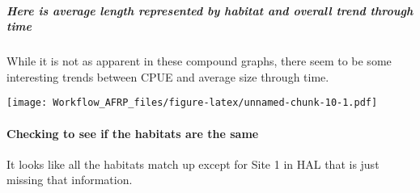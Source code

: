 \documentclass[
]{article}
\newenvironment{Shaded}{\begin{snugshade}}{\end{snugshade}}
\newcommand{\DataTypeTok}[1]{\textcolor[rgb]{0.13,0.29,0.53}{#1}}
\newcommand{\DecValTok}[1]{\textcolor[rgb]{0.00,0.00,0.81}{#1}}
\newcommand{\FloatTok}[1]{\textcolor[rgb]{0.00,0.00,0.81}{#1}}
\newcommand{\KeywordTok}[1]{\textcolor[rgb]{0.13,0.29,0.53}{\textbf{#1}}}
\newcommand{\NormalTok}[1]{#1}
\newcommand{\OperatorTok}[1]{\textcolor[rgb]{0.81,0.36,0.00}{\textbf{#1}}}
\newcommand{\StringTok}[1]{\textcolor[rgb]{0.31,0.60,0.02}{#1}}
\begin{document}
\hypertarget{here-is-average-length-represented-by-habitat-and-overall-trend-through-time}{%
\subparagraph{Here is average length represented by habitat and overall
trend through
time}\label{here-is-average-length-represented-by-habitat-and-overall-trend-through-time}}

While it is not as apparent in these compound graphs, there seem to be
some interesting trends between CPUE and average size through time.

\begin{Shaded}
\end{Shaded}

\texttt{[image: Workflow\_AFRP\_files/figure-latex/unnamed-chunk-10-1.pdf]}

\hypertarget{checking-to-see-if-the-habitats-are-the-same}{%
\paragraph{Checking to see if the habitats are the
same}\label{checking-to-see-if-the-habitats-are-the-same}}

It looks like all the habitats match up except for Site 1 in HAL that is
just missing that information.
\end{document}
